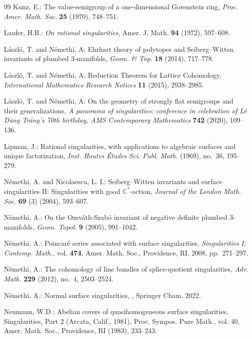 \documentclass[12pt,a4paper]{amsart}
\theoremstyle{remark}
\theoremstyle{definition}
\begin{document}
\begin{thebibliography}{99}
 Kunz, E.: The value-semigroup of a one-dimensional Gorenstein ring, {\em Proc. Amer. Math. Soc.} {\bf 25} (1970), 748--751.

Laufer, H.B.: \emph{On rational singularities}, Amer. J. Math. \textbf{94} (1972), 597--608.

L\'aszl\'o, T. and N\'emethi, A:  Ehrhart theory of polytopes and Seiberg--Witten
invariants of plumbed 3-manifolds, {\em Geom. \& Top.} {\bf 18} (2014), 717--778.

L\'aszl\'o, T. and N\'emethi, A:  Reduction Theorem for Lattice Cohomology, {\em International Mathematics Research Notices} {\bf 11} (2015), 2938--2985.



L\'aszl\'o, T. and N\'emethi, A:  On the geometry of strongly flat semigroups and their generalizations, 
{\em A panorama of singularities: conference in celebration of L\^e
  D\~ung Tr\'ang's 70th birthday, AMS Contemporary Mathematics} {\bf 742} (2020), 109--136.


Lipman, J.: Rational singularities, with applications to algebraic
  surfaces and unique factorization, \emph{Inst. Hautes \'{E}tudes Sci. Publ. Math.}
  (1969), no.~36, 195--279.

 N\'emethi, A. and Nicolaescu, L. I.: Seiberg--Witten invariants and surface singularities II: Singularities with good $\mathbb{C}^*$-action, {\em Journal of the London Math. Soc.} {\bf 69} (3) (2004), 593--607. 

N\'{e}methi, A.: On the {O}zsv\'{a}th-{S}zab\'{o} invariant of negative
  definite plumbed 3-manifolds, {\em Geom. Topol.} \textbf{9} (2005), 991--1042.

N\'{e}methi, A.: Poincar\'{e} series associated with surface singularities,
  {\em Singularities {I}, Contemp. Math.}, vol. {\bf 474}, Amer. Math. Soc., Providence,
  RI, 2008, pp.~271--297.

N\'{e}methi, A.: The cohomology of line bundles of splice-quotient
  singularities, {\em Adv. Math.} \textbf{229} (2012), no.~4, 2503--2524.

N\'emethi, A.: Normal surface singularities, , Springer Cham, 2022.

Neumann, W.D.: Abelian covers of quasihomogeneous surface singularities,
Singularities, Part 2 (Arcata, Calif., 1981), Proc. Sympos. Pure Math., vol. 40,
Amer. Math. Soc., Providence, RI (1983), 233--243.



\end{thebibliography}
\end{document}
